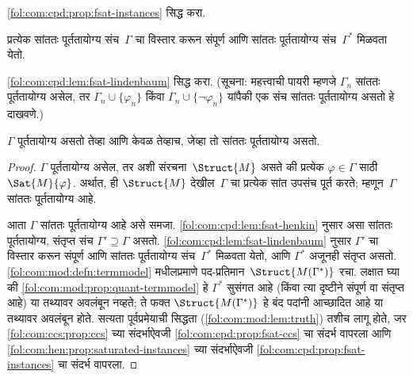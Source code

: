 \begin{prob}
\ref{fol:com:cpd:prop:fsat-instances} सिद्ध करा.
\end{prob}


\begin{lem}
\label{fol:com:cpd:lem:fsat-lindenbaum} प्रत्येक सांततः पूर्ततायोग्य संच~$\Gamma$
चा विस्तार करून संपूर्ण आणि सांततः पूर्ततायोग्य संच~$\Gamma^*$
मिळवता येतो.
\end{lem}


\begin{prob}
\ref{fol:com:cpd:lem:fsat-lindenbaum} सिद्ध करा. (सूचना: महत्त्वाची
पायरी म्हणजे $\Gamma_n$ सांततः पूर्ततायोग्य असेल, तर $\Gamma_n \cup
\{\varphi_n\}$ किंवा $\Gamma_n \cup \{\lnot \varphi_n\}$ यांपैकी एक संच सांततः
पूर्ततायोग्य असतो हे दाखवणे.)
\end{prob}




\begin{thm}[संहतता]
\label{fol:com:cpd:thm:compactness-direct} $\Gamma$ पूर्ततायोग्य असतो तेव्हा आणि
केवळ तेव्हाच, जेव्हा तो सांततः पूर्ततायोग्य असतो.
\end{thm}

\begin{proof}
$\Gamma$ पूर्ततायोग्य असेल, तर अशी
संरचना~$\Struct{M}$
असते की प्रत्येक $\varphi \in \Gamma$ साठी
$\Sat{M}{\varphi}$. अर्थात, ही
$\Struct{M}$ देखील~$\Gamma$ चा प्रत्येक
सांत उपसंच पूर्त करते; म्हणून~$\Gamma$ सांततः पूर्ततायोग्य आहे.

आता $\Gamma$ सांततः पूर्ततायोग्य आहे असे समजा.
  \ref{fol:com:cpd:lem:fsat-henkin} नुसार असा सांततः पूर्ततायोग्य, संतृप्त संच
  $\Gamma' \supseteq \Gamma$ असतो. \ref{fol:com:cpd:lem:fsat-lindenbaum} नुसार
$\Gamma'$ चा विस्तार करून संपूर्ण आणि सांततः
पूर्ततायोग्य संच~$\Gamma^*$ मिळवता येतो, आणि $\Gamma^*$
  अजूनही संतृप्त असतो. \ref{fol:com:mod:defn:termmodel} मधीलप्रमाणे
पद-प्रतिमान~$\Struct{M(\Gamma^*)}$
रचा. लक्षात घ्या की \ref{fol:com:mod:prop:quant-termmodel} हे
$\Gamma^*$ सुसंगत आहे (किंवा त्या दृष्टीने संपूर्ण वा संतृप्त आहे)
या तथ्यावर अवलंबून नव्हते; ते फक्त $\Struct{M(\Gamma^*)}$ हे बंद पदांनी
आच्छादित आहे या तथ्यावर अवलंबून होते.
सत्यता पूर्वप्रमेयाची सिद्धता (\ref{fol:com:mod:lem:truth}) तशीच लागू होते,
जर \ref{fol:com:ccs:prop:ccs} च्या संदर्भाऐवजी
\ref{fol:com:cpd:prop:fsat-ccs} चा संदर्भ वापरला आणि
\ref{fol:com:hen:prop:saturated-instances} च्या संदर्भाऐवजी
\ref{fol:com:cpd:prop:fsat-instances} चा संदर्भ वापरला.

\end{proof}


